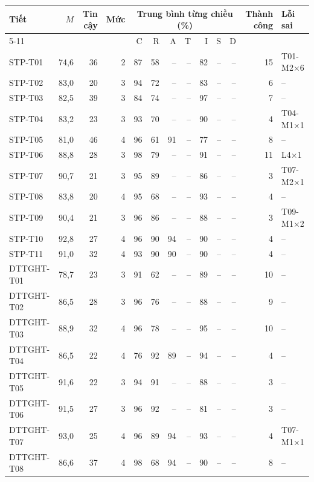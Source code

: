 \scriptsize
\begin{tabular}{@{}lrrrrrrrrrrrl@{}}
\toprule
Tiết & $M$ & Tin cậy & Mức & \multicolumn{7}{c}{Trung bình từng chiều (\%)} & Thành công & Lỗi sai \\
\cmidrule(lr){5-11}
 & & & & C & R & A & T & I & S & D & & \\
\midrule
STP-T01 & 74,6 & 36 & 2 & 87 & 58 & -- & -- & 82 & -- & -- & 15 & T01-M2×6 \\
STP-T02 & 83,0 & 20 & 3 & 94 & 72 & -- & -- & 83 & -- & -- & 6 & -- \\
STP-T03 & 82,5 & 39 & 3 & 84 & 74 & -- & -- & 97 & -- & -- & 7 & -- \\
STP-T04 & 83,2 & 23 & 3 & 93 & 70 & -- & -- & 90 & -- & -- & 4 & T04-M1×1 \\
STP-T05 & 81,0 & 46 & 4 & 96 & 61 & 91 & -- & 77 & -- & -- & 8 & -- \\
STP-T06 & 88,8 & 28 & 3 & 98 & 79 & -- & -- & 91 & -- & -- & 11 & L4×1 \\
STP-T07 & 90,7 & 21 & 3 & 95 & 89 & -- & -- & 86 & -- & -- & 3 & T07-M2×1 \\
STP-T08 & 83,8 & 20 & 4 & 95 & 68 & -- & -- & 93 & -- & -- & 4 & -- \\
STP-T09 & 90,4 & 21 & 3 & 96 & 86 & -- & -- & 88 & -- & -- & 3 & T09-M1×2 \\
STP-T10 & 92,8 & 27 & 4 & 96 & 90 & 94 & -- & 90 & -- & -- & 4 & -- \\
STP-T11 & 91,0 & 32 & 4 & 93 & 90 & 90 & -- & 90 & -- & -- & 4 & -- \\
\midrule
DTTGHT-T01 & 78,7 & 23 & 3 & 91 & 62 & -- & -- & 89 & -- & -- & 10 & -- \\
DTTGHT-T02 & 86,5 & 28 & 3 & 96 & 76 & -- & -- & 88 & -- & -- & 9 & -- \\
DTTGHT-T03 & 88,9 & 32 & 4 & 96 & 78 & -- & -- & 95 & -- & -- & 10 & -- \\
DTTGHT-T04 & 86,5 & 22 & 4 & 76 & 92 & 89 & -- & 94 & -- & -- & 4 & -- \\
DTTGHT-T05 & 91,6 & 22 & 3 & 94 & 91 & -- & -- & 88 & -- & -- & 3 & -- \\
DTTGHT-T06 & 91,5 & 27 & 3 & 96 & 92 & -- & -- & 81 & -- & -- & 3 & -- \\
DTTGHT-T07 & 93,0 & 25 & 4 & 96 & 89 & 94 & -- & 93 & -- & -- & 4 & T07-M1×1 \\
DTTGHT-T08 & 86,6 & 37 & 4 & 98 & 68 & 94 & -- & 90 & -- & -- & 8 & -- \\
\bottomrule
\end{tabular}
